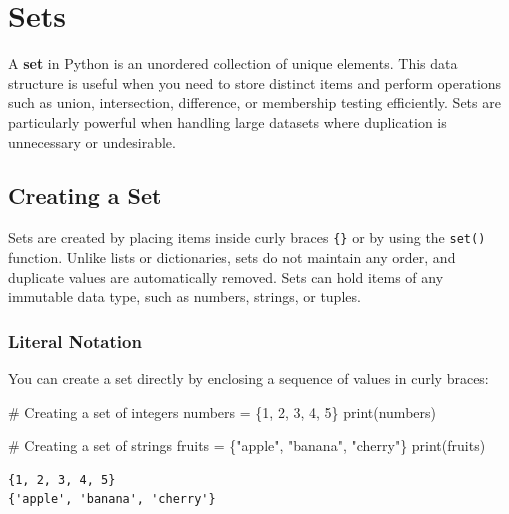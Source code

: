 \documentclass[
  letterpaper,
  DIV=11,
  numbers=noendperiod]{scrreprt}
\newenvironment{Shaded}{\begin{snugshade}}{\end{snugshade}}
\newcommand{\BuiltInTok}[1]{\textcolor[rgb]{0.00,0.23,0.31}{#1}}
\newcommand{\CommentTok}[1]{\textcolor[rgb]{0.37,0.37,0.37}{#1}}
\newcommand{\DecValTok}[1]{\textcolor[rgb]{0.68,0.00,0.00}{#1}}
\newcommand{\NormalTok}[1]{\textcolor[rgb]{0.00,0.23,0.31}{#1}}
\newcommand{\OperatorTok}[1]{\textcolor[rgb]{0.37,0.37,0.37}{#1}}
\newcommand{\StringTok}[1]{\textcolor[rgb]{0.13,0.47,0.30}{#1}}
\begin{document}
\hypertarget{sets}{%
\section{Sets}\label{sets}}

A \textbf{set} in Python is an unordered collection of unique elements.
This data structure is useful when you need to store distinct items and
perform operations such as union, intersection, difference, or
membership testing efficiently. Sets are particularly powerful when
handling large datasets where duplication is unnecessary or undesirable.

\hypertarget{creating-a-set}{%
\subsection{Creating a Set}\label{creating-a-set}}

Sets are created by placing items inside curly braces \texttt{\{\}} or
by using the \texttt{set()} function. Unlike lists or dictionaries, sets
do not maintain any order, and duplicate values are automatically
removed. Sets can hold items of any immutable data type, such as
numbers, strings, or tuples.

\hypertarget{literal-notation-1}{%
\subsubsection{Literal Notation}\label{literal-notation-1}}

You can create a set directly by enclosing a sequence of values in curly
braces:

\begin{Shaded}
\begin{Highlighting}[]
\CommentTok{\# Creating a set of integers}
\NormalTok{numbers }\OperatorTok{=}\NormalTok{ \{}\DecValTok{1}\NormalTok{, }\DecValTok{2}\NormalTok{, }\DecValTok{3}\NormalTok{, }\DecValTok{4}\NormalTok{, }\DecValTok{5}\NormalTok{\}}
\BuiltInTok{print}\NormalTok{(numbers)  }

\CommentTok{\# Creating a set of strings}
\NormalTok{fruits }\OperatorTok{=}\NormalTok{ \{}\StringTok{"apple"}\NormalTok{, }\StringTok{"banana"}\NormalTok{, }\StringTok{"cherry"}\NormalTok{\}}
\BuiltInTok{print}\NormalTok{(fruits)  }
\end{Highlighting}
\end{Shaded}

\begin{verbatim}
{1, 2, 3, 4, 5}
{'apple', 'banana', 'cherry'}
\end{verbatim}
\end{document}
